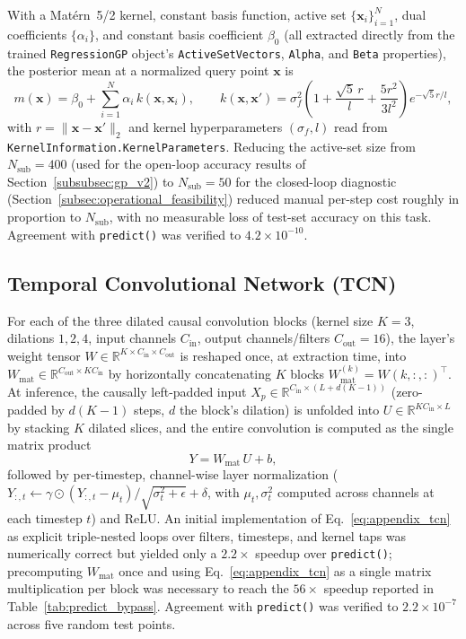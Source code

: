 With a Mat\'ern~5/2 kernel, constant basis function, active set
$\{\mathbf{x}_i\}_{i=1}^{N}$, dual coefficients $\{\alpha_i\}$, and
constant basis coefficient $\beta_0$ (all extracted directly from the
trained \texttt{RegressionGP} object's \texttt{ActiveSetVectors},
\texttt{Alpha}, and \texttt{Beta} properties), the posterior mean at a
normalized query point $\mathbf{x}$ is
\begin{equation}
m(\mathbf{x}) = \beta_0 + \sum_{i=1}^{N} \alpha_i\, k(\mathbf{x}, \mathbf{x}_i),
\qquad
k(\mathbf{x},\mathbf{x}') = \sigma_f^2\!\left(1+\frac{\sqrt{5}\,r}{l}+\frac{5r^2}{3l^2}\right)
e^{-\sqrt{5}r/l},
\label{eq:appendix_gp}
\end{equation}
with $r=\lVert\mathbf{x}-\mathbf{x}'\rVert_2$ and kernel hyperparameters
$(\sigma_f, l)$ read from \texttt{KernelInformation.KernelParameters}.
Reducing the active-set size from $N_{\text{sub}}=400$ (used for the
open-loop accuracy results of Section~\ref{subsubsec:gp_v2}) to
$N_{\text{sub}}=50$ for the closed-loop diagnostic
(Section~\ref{subsec:operational_feasibility}) reduced manual per-step
cost roughly in proportion to $N_{\text{sub}}$, with no measurable loss
of test-set accuracy on this task. Agreement with \texttt{predict()}
was verified to $4.2\times10^{-10}$.

\subsection{Temporal Convolutional Network (TCN)}
\label{subsec:appendix_tcn}

For each of the three dilated causal convolution blocks (kernel size
$K=3$, dilations $1,2,4$, input channels $C_{\text{in}}$, output
channels/filters $C_{\text{out}}=16$), the layer's weight tensor
$W\in\mathbb{R}^{K\times C_{\text{in}}\times C_{\text{out}}}$ is
reshaped once, at extraction time, into
$W_{\text{mat}}\in\mathbb{R}^{C_{\text{out}}\times KC_{\text{in}}}$ by
horizontally concatenating $K$ blocks $W_{\text{mat}}^{(k)} =
W(k,:,:)^\top$. At inference, the causally left-padded input
$X_p\in\mathbb{R}^{C_{\text{in}}\times(L+d(K-1))}$ (zero-padded by
$d(K-1)$ steps, $d$ the block's dilation) is unfolded into
$U\in\mathbb{R}^{KC_{\text{in}}\times L}$ by stacking $K$ dilated
slices, and the entire convolution is computed as the single matrix
product
\begin{equation}
Y = W_{\text{mat}}\, U + b,
\label{eq:appendix_tcn}
\end{equation}
followed by per-timestep, channel-wise layer normalization
($Y_{:,t} \leftarrow \gamma\odot(Y_{:,t}-\mu_t)/\sqrt{\sigma_t^2+\epsilon}+\delta$,
with $\mu_t,\sigma_t^2$ computed across channels at each timestep $t$)
and ReLU. An initial implementation of Eq.~\eqref{eq:appendix_tcn} as
explicit triple-nested loops over filters, timesteps, and kernel taps
was numerically correct but yielded only a $2.2\times$ speedup over
\texttt{predict()}; precomputing $W_{\text{mat}}$ once and using
Eq.~\eqref{eq:appendix_tcn} as a single matrix multiplication per block
was necessary to reach the $56\times$ speedup reported in
Table~\ref{tab:predict_bypass}. Agreement with \texttt{predict()} was
verified to $2.2\times10^{-7}$ across five random test points.

